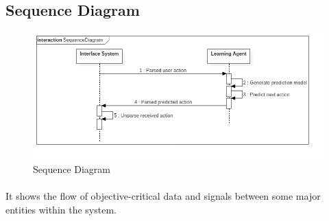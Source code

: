 	\subsection{Sequence Diagram}
	\begin{figure}[H]
	\includegraphics[width=\textwidth]{./Chapter5/SequenceDiagram}
		\caption{Sequence Diagram}
	\end{figure}
	\paragraph{}
	It shows the flow of objective-critical data and signals between some major entities within the system.

